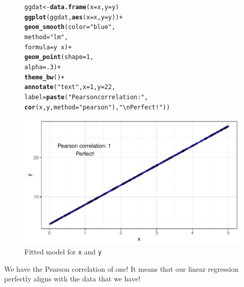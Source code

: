 \documentclass{article}\usepackage[]{graphicx}\usepackage[]{color}
\makeatletter
\def\maxwidth{ %
  \ifdim\Gin@nat@width>\linewidth
    \linewidth
  \else
    \Gin@nat@width
  \fi
}
\newcommand{\hlnum}[1]{\textcolor[rgb]{0.686,0.059,0.569}{#1}}%
\newcommand{\hlstr}[1]{\textcolor[rgb]{0.192,0.494,0.8}{#1}}%
\newcommand{\hlopt}[1]{\textcolor[rgb]{0,0,0}{#1}}%
\newcommand{\hlstd}[1]{\textcolor[rgb]{0.345,0.345,0.345}{#1}}%
\newcommand{\hlkwb}[1]{\textcolor[rgb]{0.69,0.353,0.396}{#1}}%
\newcommand{\hlkwc}[1]{\textcolor[rgb]{0.333,0.667,0.333}{#1}}%
\newcommand{\hlkwd}[1]{\textcolor[rgb]{0.737,0.353,0.396}{\textbf{#1}}}%
\newenvironment{kframe}{%
 \def\at@end@of@kframe{}%
 \ifinner\ifhmode%
  \def\at@end@of@kframe{\end{minipage}}%
  \begin{minipage}{\columnwidth}%
 \fi\fi%
 \def\FrameCommand##1{\hskip\@totalleftmargin \hskip-\fboxsep
 \colorbox{shadecolor}{##1}\hskip-\fboxsep
     \hskip-\linewidth \hskip-\@totalleftmargin \hskip\columnwidth}%
 \MakeFramed {\advance\hsize-\width
   \@totalleftmargin\z@ \linewidth\hsize
   \@setminipage}}%
 {\par\unskip\endMakeFramed%
 \at@end@of@kframe}
\newenvironment{knitrout}{}{} %
\makeatother
\begin{document}
\begin{enumerate}
\begin{enumerate}
\begin{figure}[H]
\begin{center}
\begin{knitrout}
\color{fgcolor}\begin{kframe}
\begin{alltt}
\hlstd{ggdat}\hlkwb{<-}\hlkwd{data.frame}\hlstd{(}\hlkwc{x}\hlstd{=x,} \hlkwc{y}\hlstd{=y)}
\hlkwd{ggplot}\hlstd{(ggdat,} \hlkwd{aes}\hlstd{(}\hlkwc{x}\hlstd{=x,} \hlkwc{y}\hlstd{=y))}\hlopt{+}
  \hlkwd{geom_smooth}\hlstd{(}\hlkwc{color}\hlstd{=}\hlstr{"blue"}\hlstd{,}
              \hlkwc{method}\hlstd{=}\hlstr{"lm"}\hlstd{,}
              \hlkwc{formula}\hlstd{=y}\hlopt{~}\hlstd{x)}\hlopt{+}
  \hlkwd{geom_point}\hlstd{(}\hlkwc{shape}\hlstd{=}\hlnum{1}\hlstd{,}
             \hlkwc{alpha}\hlstd{=}\hlnum{.3}\hlstd{)}\hlopt{+}
  \hlkwd{theme_bw}\hlstd{()}\hlopt{+}
  \hlkwd{annotate}\hlstd{(}\hlstr{"text"}\hlstd{,} \hlkwc{x}\hlstd{=}\hlnum{1}\hlstd{,} \hlkwc{y}\hlstd{=}\hlnum{22}\hlstd{,}
           \hlkwc{label}\hlstd{=}\hlkwd{paste}\hlstd{(}\hlstr{"Pearson correlation:"}\hlstd{,}
                       \hlkwd{cor}\hlstd{(x,y,}\hlkwc{method}\hlstd{=}\hlstr{"pearson"}\hlstd{),}\hlstr{"\textbackslash{}nPerfect!"}\hlstd{))}
\end{alltt}
\end{kframe}
\includegraphics[width=\maxwidth]{figure/p3plot1-1} 
\end{knitrout}
\caption{Fitted model for \texttt{x} and \texttt{y}}
\label{p3plot1}
\end{center}
\end{figure}
We have the Pearson correlation of one! It means that our linear regression perfectly aligns with the data that we have!



\end{enumerate}
\end{enumerate}
\end{document}
